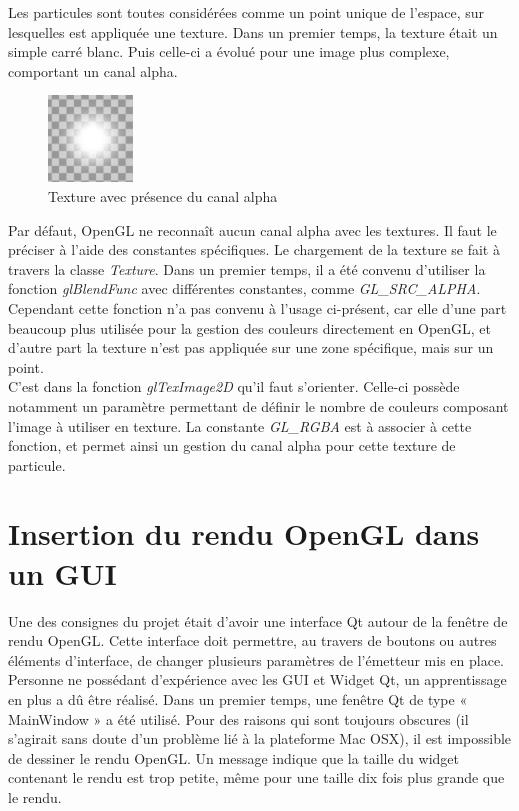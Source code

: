 Les particules sont toutes considérées comme un point unique de l'espace, sur
lesquelles est appliquée une texture. Dans un premier temps, la texture était un
simple carré blanc. Puis celle-ci a évolué pour une image plus complexe,
comportant un canal alpha.

\begin{figure}[h]
	\begin{center}
		\includegraphics[width=0.2\textwidth]{img/33-texture.png}
	\end{center}
	\caption{Texture avec présence du canal alpha}
\end{figure}

Par défaut, OpenGL ne reconnaît aucun canal alpha avec les textures. Il faut le
préciser à l'aide des constantes spécifiques. Le chargement de la texture se
fait à travers la classe \emph{Texture}. Dans un premier temps, il a été convenu
d'utiliser la fonction \emph{glBlendFunc} avec différentes constantes, comme
\emph{GL\_SRC\_ALPHA}. Cependant cette fonction n'a pas convenu à l'usage ci-présent,
car elle d'une part beaucoup plus utilisée pour la gestion des couleurs
directement en OpenGL, et d'autre part la texture n'est pas appliquée sur une 
zone spécifique, mais sur un point.\\

C'est dans la fonction \emph{glTexImage2D} qu'il faut s'orienter. Celle-ci possède
notamment un paramètre permettant de définir le nombre de couleurs composant
l'image à utiliser en texture. La constante \emph{GL\_RGBA} est à associer à cette
fonction, et permet ainsi un gestion du canal alpha pour cette texture de
particule.

\section{Insertion du rendu OpenGL dans un GUI}

Une des consignes du projet était d'avoir une interface Qt autour de la fenêtre
de rendu OpenGL. Cette interface doit permettre, au travers de boutons ou autres
éléments d'interface, de changer plusieurs paramètres de l'émetteur mis en
place. Personne ne possédant d'expérience avec les GUI et Widget Qt, un
apprentissage en plus a dû être réalisé. Dans un premier temps, une fenêtre Qt 
de type « MainWindow » a été utilisé. Pour des raisons qui sont toujours
obscures (il s'agirait sans doute d'un problème lié à la plateforme Mac OSX), il
est impossible de dessiner le rendu OpenGL. Un message indique que la taille du
widget contenant le rendu est trop petite, même pour une taille dix fois plus
grande que le rendu.\\

